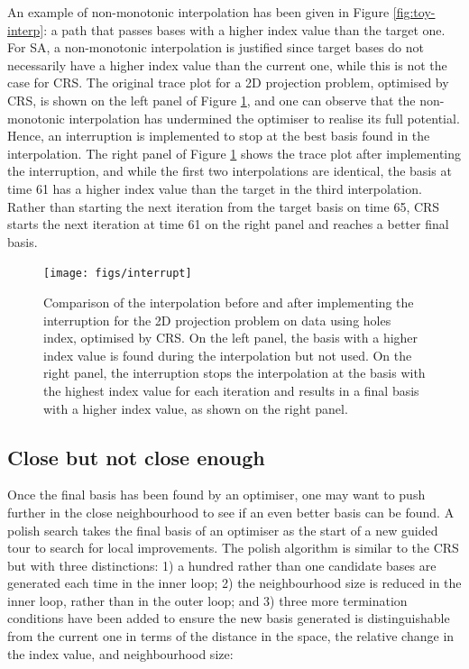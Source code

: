 An example of non-monotonic interpolation has been given in Figure \ref{fig:toy-interp}: a path that passes bases with a higher index value than the target one. For SA, a non-monotonic interpolation is justified since target bases do not necessarily have a higher index value than the current one, while this is not the case for CRS. The original trace plot for a 2D projection problem, optimised by CRS, is shown on the left panel of Figure \ref{fig:interruption}, and one can observe that the non-monotonic interpolation has undermined the optimiser to realise its full potential. Hence, an interruption is implemented to stop at the best basis found in the interpolation. The right panel of Figure \ref{fig:interruption} shows the trace plot after implementing the interruption, and while the first two interpolations are identical, the basis at time 61 has a higher index value than the target in the third interpolation. Rather than starting the next iteration from the target basis on time 65, CRS starts the next iteration at time 61 on the right panel and reaches a better final basis.

\begin{figure}

{\centering \texttt{[image: figs/interrupt]} 

}

\caption{Comparison of the interpolation before and after implementing the interruption for the 2D projection problem on  data using holes index, optimised by CRS. On the left panel, the basis with a higher index value is found during the interpolation but not used. On the right panel, the interruption stops the interpolation at the basis with the highest index value for each iteration and results in a final basis with a higher index value, as shown on the right panel.}\label{fig:interruption}
\end{figure}

\hypertarget{close-but-not-close-enough}{%
\subsection{Close but not close enough}\label{close-but-not-close-enough}}

Once the final basis has been found by an optimiser, one may want to push further in the close neighbourhood to see if an even better basis can be found. A polish search takes the final basis of an optimiser as the start of a new guided tour to search for local improvements. The polish algorithm is similar to the CRS but with three distinctions: 1) a hundred rather than one candidate bases are generated each time in the inner loop; 2) the neighbourhood size is reduced in the inner loop, rather than in the outer loop; and 3) three more termination conditions have been added to ensure the new basis generated is distinguishable from the current one in terms of the distance in the space, the relative change in the index value, and neighbourhood size:

